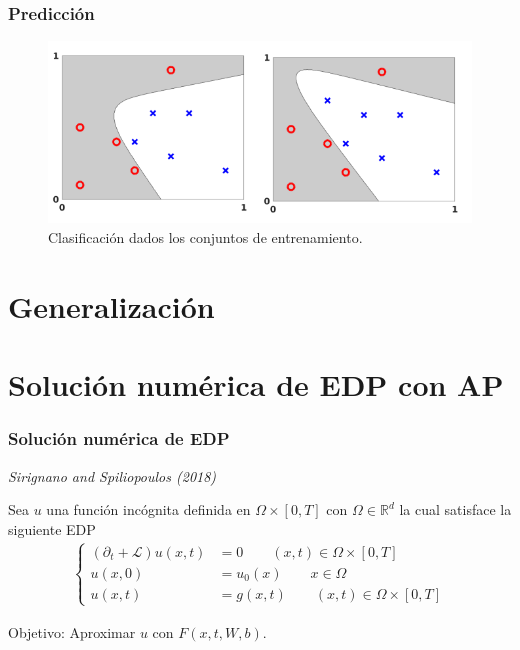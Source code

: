 \documentclass[aspectratio=1610]{beamer}
\begin{document}
\begin{frame}
  \frametitle{Predicci\'on}

  \begin{figure}[h]
    \centering
    \includegraphics[scale=2]{fig7}
    \caption{Clasificaci\'on dados los conjuntos de entrenamiento. }
  \end{figure}
  
\end{frame}

\section{Generalización}




  \section{Solución num\'erica de EDP con AP }
\begin{frame}
  \frametitle{ Soluci\'on  num\'erica de EDP }
  \textit{Sirignano and Spiliopoulos (2018)}
  
  Sea $u$ una funci\'on inc\'ognita definida en $\Omega \times [0,T]$ con $\Omega\in \mathbb{R}^d$ la cual satisface la siguiente EDP
  \begin{align*}
    \begin{cases}
      (\partial_t + \mathcal{L}) u(x,t)  &= 0  \qquad  (x,t)\in \Omega \times [0,T] \\
      u(x,0) & = u_0(x) \qquad x\in \Omega \\
      u(x,t) & = g(x,t) \qquad (x,t) \in  \Omega \times [0,T] 
    \end{cases}
  \end{align*}

  Objetivo: Aproximar $u$ con $F(x,t,W,b)$.

\end{frame}
\end{document}
